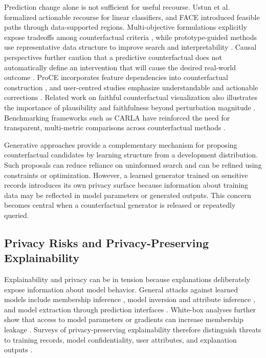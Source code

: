 \documentclass[preprint,12pt]{elsarticle}
\begin{document}
Prediction change alone is not sufficient for useful recourse. Ustun et
al.~\cite{ustun2019recourse} formalized actionable recourse for linear
classifiers, and FACE \cite{poyiadzi2020face} introduced feasible paths through
data-supported regions. Multi-objective formulations explicitly expose
tradeoffs among counterfactual criteria \cite{dandl2020moc}, while
prototype-guided methods use representative data structure to improve search
and interpretability \cite{vanlooveren2021prototypes}. Causal perspectives
further caution that a predictive counterfactual does not automatically define
an intervention that will cause the desired real-world outcome
\cite{karimi2021interventions}. ProCE incorporates feature dependencies into
counterfactual construction \cite{duong2024proce}, and user-centred studies
emphasize understandable and actionable corrections
\cite{wijekoon2023discern}. Related work on faithful counterfactual
visualization also illustrates the importance of plausibility and faithfulness
beyond perturbation magnitude \cite{khan2024fcve}. Benchmarking frameworks
such as CARLA have reinforced the need for transparent, multi-metric comparisons
across counterfactual methods \cite{pawelczyk2021carla}.

Generative approaches provide a complementary mechanism for proposing
counterfactual candidates by learning structure from a development
distribution. Such proposals can reduce reliance on uninformed search and can
be refined using constraints or optimization. However, a learned generator
trained on sensitive records introduces its own privacy surface because
information about training data may be reflected in model parameters or
generated outputs. This concern becomes central when a counterfactual generator
is released or repeatedly queried.

\subsection{Privacy Risks and Privacy-Preserving Explainability}
\label{subsec:privacy_xai}

Explainability and privacy can be in tension because explanations deliberately
expose information about model behavior. General attacks against learned models
include membership inference \cite{shokri2017membership,yeom2018privacy},
model inversion and attribute inference \cite{fredrikson2015inversion}, and
model extraction through prediction interfaces \cite{tramer2016stealing}.
White-box analyses further show that access to model parameters or gradients can
increase membership leakage \cite{nasr2019privacy}. Surveys of
privacy-preserving explainability therefore distinguish threats to training
records, model confidentiality, user attributes, and explanation outputs
\cite{bozorgpanah2024explainable,nguyen2025privacy}.
\end{document}
